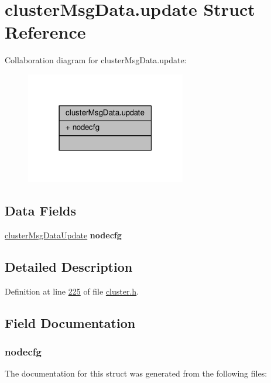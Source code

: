 \hypertarget{structclusterMsgData_8update}{}\section{cluster\+Msg\+Data.\+update Struct Reference}
\label{structclusterMsgData_8update}


Collaboration diagram for cluster\+Msg\+Data.\+update\+:\nopagebreak
\begin{figure}[H]
\begin{center}
\leavevmode
\includegraphics[width=198pt]{structclusterMsgData_8update__coll__graph}
\end{center}
\end{figure}
\subsection*{Data Fields}
\begin{DoxyCompactItemize}
\item 
\mbox{\label{structclusterMsgData_8update_a062ab3f657fd3b5fb7a452a0fb5bcd74}} 
\hyperlink{structclusterMsgDataUpdate}{cluster\+Msg\+Data\+Update} {\bfseries nodecfg}
\end{DoxyCompactItemize}


\subsection{Detailed Description}


Definition at line \hyperlink{cluster_8h_source_l00225}{225} of file \hyperlink{cluster_8h_source}{cluster.\+h}.



\subsection{Field Documentation}
\mbox{\label{structclusterMsgData_8update_a062ab3f657fd3b5fb7a452a0fb5bcd74}} 
\subsubsection{\texorpdfstring{nodecfg}{nodecfg}}
{\footnotesize\ttfamily }



The documentation for this struct was generated from the following files\+: